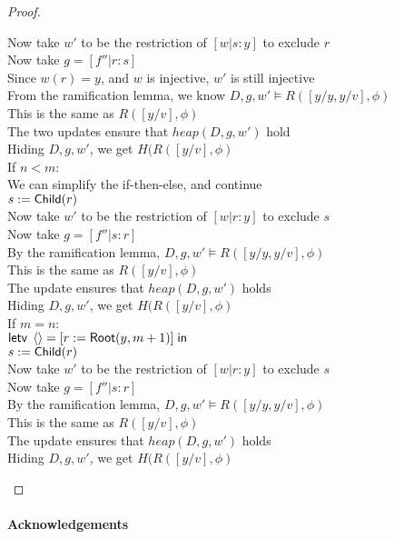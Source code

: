 \begin{proof}
\begin{tabbedproof}
\ooooo Now take $w'$ to be the restriction of $[w|s:y]$ to exclude $r$ \\
\ooooo Now take $g = [f''|r:s]$ \\
\ooooo Since $w(r) = y$, and $w$ is injective, $w'$ is still injective \\
\ooooo From the ramification lemma, we know $D, g, w' \models R([y/y, y/v], \phi)$ \\
\ooooo This is the same as $R([y/v], \phi)$ \\
\ooooo The two updates ensure that $\mathit{heap}(D, g, w')$ hold \\
\ooooo Hiding $D, g, w'$, we get $H(R([y/v], \phi)$ \\
\oooo If $n < m$: \\
\ooooo We can simplify the if-then-else, and continue \\
\ooooo $s := \mathsf{Child}(r)$ \\
\ooooo Now take $w'$ to be the restriction of $[w|r:y]$ to exclude $s$ \\
\ooooo Now take $g = [f''|s:r]$ \\
\ooooo By the ramification lemma, $D, g, w' \models R([y/y, y/v], \phi)$ \\
\ooooo This is the same as $R([y/v], \phi)$ \\
\ooooo The update ensures that $\mathit{heap}(D, g, w')$ holds \\
\ooooo Hiding $D, g, w'$, we get $H(R([y/v], \phi)$ \\
\oooo If $m = n$: \\
\ooooo $\mathsf{letv}\;\left<\right> = [r := \mathsf{Root}(y, m+1)]\;\mathsf{in}\;$ \\
\ooooo $s := \mathsf{Child}(r)$ \\
\ooooo Now take $w'$ to be the restriction of $[w|r:y]$ to exclude $s$ \\
\ooooo Now take $g = [f''|s:r]$ \\
\ooooo By the ramification lemma, $D, g, w' \models R([y/y, y/v], \phi)$ \\
\ooooo This is the same as $R([y/v], \phi)$ \\
\ooooo The update ensures that $\mathit{heap}(D, g, w')$ holds \\
\ooooo Hiding $D, g, w'$, we get $H(R([y/v], \phi)$ \\

\end{tabbedproof}
\end{proof}

\paragraph{Acknowledgements}

